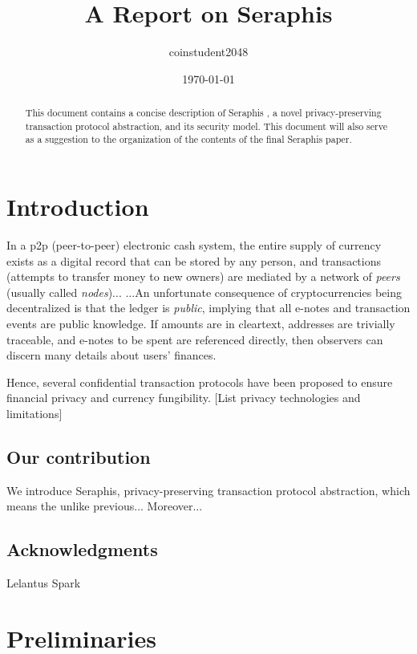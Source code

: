 \documentclass{article}
\title{A Report on Seraphis}
\author{coinstudent2048}
\date{\today}
\theoremstyle{plain}
\theoremstyle{remark}
\begin{document}
\maketitle

\begin{abstract}
This document contains a concise description of Seraphis \cite{seraphis}, a novel privacy-preserving transaction protocol abstraction, and its security model. This document will also serve as a suggestion to the organization of the contents of the final Seraphis paper.
\end{abstract}

\section{Introduction}
In a p2p (peer-to-peer) electronic cash system, the entire supply of currency exists as a digital record that can be stored by any person, and transactions (attempts to transfer money to new owners) are mediated by a network of \textit{peers} (usually called \textit{nodes})... ...An unfortunate consequence of cryptocurrencies being decentralized is that the ledger is \textit{public}, implying that all e-notes and transaction events are public knowledge. If amounts are in cleartext, addresses are trivially traceable, and e-notes to be spent are referenced directly, then observers can discern many details about users’ finances.

Hence, several confidential transaction protocols have been proposed to ensure financial privacy and currency fungibility. [List privacy technologies and limitations]
\subsection{Our contribution}
We introduce Seraphis, privacy-preserving transaction protocol abstraction, which means the unlike previous... Moreover...
\subsection{Acknowledgments}
Lelantus Spark

\section{Preliminaries}
\end{document}
